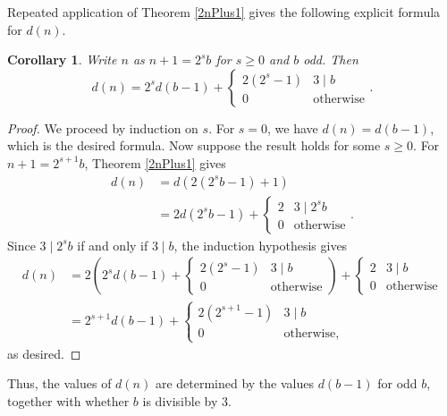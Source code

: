 \documentclass[a4paper]{article}
\newtheorem{corollary}[theorem]{Corollary}
\begin{document}
	Repeated application of Theorem \ref{2nPlus1} gives the following explicit formula for $d(n)$.
	\begin{corollary}\label{2nPlus1Explicit}
		Write $n$ as $n+1 = 2^s b$ for $s \geq 0$ and $b$ odd.
		Then
		\begin{equation*}
			d(n) = 2^s d(b-1) + \begin{cases}
				2(2^s - 1) & 3 \mid b \\
				0 & \text{otherwise}
			\end{cases}.
		\end{equation*}
	\end{corollary}
	\begin{proof}
		We proceed by induction on $s$.
		For $s=0$, we have $d(n) = d(b-1)$, which is the desired formula.
		Now suppose the result holds for some $s \geq 0$.
		For $n+1 = 2^{s+1}b$, Theorem \ref{2nPlus1} gives
		\begin{align*}
			d(n) &= d\left(2\left(2^s b - 1\right) + 1\right) \\
			&= 2d\left(2^s b - 1\right) + \begin{cases}
				2 & 3 \mid 2^s b \\
				0 & \text{otherwise}
			\end{cases}.
		\end{align*}
		Since $3 \mid 2^s b$ if and only if $3 \mid b$, the induction hypothesis gives
		\begin{align*}
			d(n) &= 2\left(2^s d(b-1) + \begin{cases}
				2(2^s - 1) & 3 \mid b \\
				0 & \text{otherwise}
			\end{cases}\right) + \begin{cases}
				2 & 3 \mid b \\
				0 & \text{otherwise}
			\end{cases} \\
			&= 2^{s+1}d(b-1) + \begin{cases}
				2(2^{s+1} - 1) & 3 \mid b \\
				0 & \text{otherwise},
			\end{cases} 
		\end{align*}
		as desired.
	\end{proof}
	Thus, the values of $d(n)$ are determined by the values $d(b-1)$ for odd $b$, together with whether $b$ is divisible by 3.
	
\end{document}
